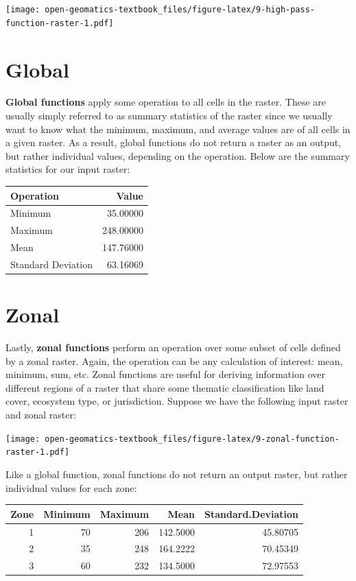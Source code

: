 \documentclass[
]{book}
\begin{document}
\texttt{[image: open-geomatics-textbook\_files/figure-latex/9-high-pass-function-raster-1.pdf]}

\hypertarget{global}{%
\section{Global}\label{global}}

\textbf{Global functions} apply some operation to all cells in the raster. These are usually simply referred to as summary statistics of the raster since we usually want to know what the minimum, maximum, and average values are of all cells in a given raster. As a result, global functions do not return a raster as an output, but rather individual values, depending on the operation. Below are the summary statistics for our input raster:

\begin{tabular}{lr}
\toprule
Operation & Value\\
\midrule
Minimum & 35.00000\\
Maximum & 248.00000\\
Mean & 147.76000\\
Standard Deviation & 63.16069\\
\bottomrule
\end{tabular}

\hypertarget{zonal}{%
\section{Zonal}\label{zonal}}

Lastly, \textbf{zonal functions} perform an operation over some subset of cells defined by a zonal raster. Again, the operation can be any calculation of interest: mean, minimum, sum, etc. Zonal functions are useful for deriving information over different regions of a raster that share some thematic classification like land cover, ecosystem type, or jurisdiction. Suppose we have the following input raster and zonal raster:

\texttt{[image: open-geomatics-textbook\_files/figure-latex/9-zonal-function-raster-1.pdf]}

Like a global function, zonal functions do not return an output raster, but rather individual values for each zone:

\begin{tabular}{rrrrr}
\toprule
Zone & Minimum & Maximum & Mean & Standard.Deviation\\
\midrule
1 & 70 & 206 & 142.5000 & 45.80705\\
2 & 35 & 248 & 164.2222 & 70.45349\\
3 & 60 & 232 & 134.5000 & 72.97553\\
\bottomrule
\end{tabular}
\end{document}
